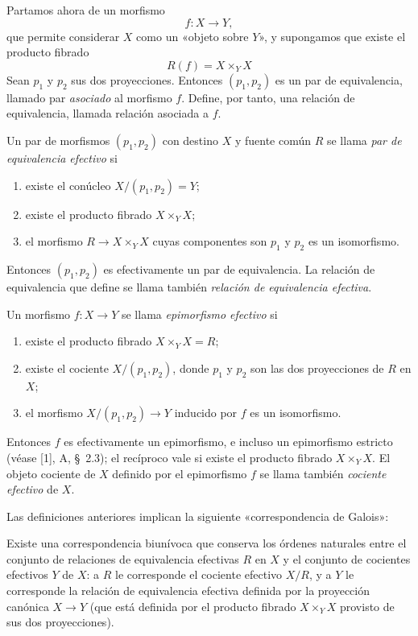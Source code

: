 Partamos ahora de un morfismo
\[
  f:X\longrightarrow Y,
\]
que permite considerar $X$ como un «objeto sobre $Y$», y supongamos que existe
el producto fibrado
\[
  R(f)=X\times_Y X
\]
Sean $p_1$ y $p_2$ sus dos proyecciones. Entonces $(p_1,p_2)$ es un par de
equivalencia, llamado par \emph{asociado} al morfismo $f$. Define, por tanto,
una relación de equivalencia, llamada relación asociada a $f$.

Un par de morfismos $(p_1,p_2)$ con destino $X$ y fuente común $R$ se llama
\emph{par de equivalencia efectivo} si
\begin{enumerate}
  \item[(i)] existe el conúcleo $X/(p_1,p_2)=Y$;
  \item[(ii)] existe el producto fibrado $X\times_Y X$;
  \item[(iii)] el morfismo $R\longrightarrow X\times_Y X$ cuyas componentes son
  $p_1$ y $p_2$ es un isomorfismo.
\end{enumerate}
Entonces $(p_1,p_2)$ es efectivamente un par de equivalencia. La relación de
equivalencia que define se llama también \emph{relación de equivalencia
efectiva}.

Un morfismo $f:X\longrightarrow Y$ se llama \emph{epimorfismo efectivo} si
\begin{enumerate}
  \item[(i)] existe el producto fibrado $X\times_Y X=R$;
  \item[(ii)] existe el cociente $X/(p_1,p_2)$, donde $p_1$ y $p_2$ son las dos
  proyecciones de $R$ en $X$;
  \item[(iii)] el morfismo $X/(p_1,p_2)\longrightarrow Y$ inducido por $f$ es un
  isomorfismo.
\end{enumerate}
Entonces $f$ es efectivamente un epimorfismo, e incluso un epimorfismo
estricto (véase [1], A, \S~2.3); el recíproco vale si existe el producto
fibrado $X\times_Y X$. El objeto cociente de $X$ definido por el epimorfismo
$f$ se llama también \emph{cociente efectivo} de $X$.

Las definiciones anteriores implican la siguiente «correspondencia de
Galois»:

 Existe una correspondencia biunívoca que conserva
los órdenes naturales entre el conjunto de relaciones de equivalencia
efectivas $R$ en $X$ y el conjunto de cocientes efectivos $Y$ de $X$: a $R$
le corresponde el cociente efectivo $X/R$, y a $Y$ le corresponde la relación
de equivalencia efectiva definida por la proyección canónica
$X\longrightarrow Y$ (que está definida por el producto fibrado
$X\times_Y X$ provisto de sus dos proyecciones).

